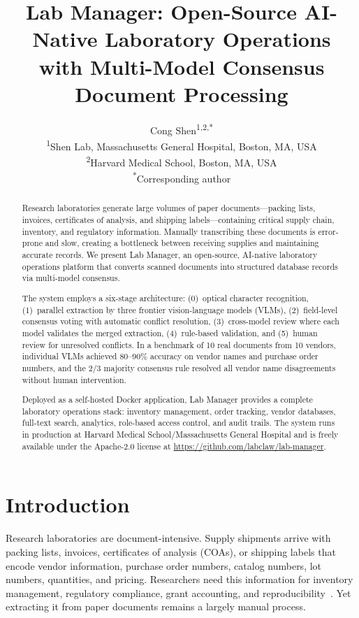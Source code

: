\documentclass[11pt]{article}
\title{Lab Manager: Open-Source AI-Native Laboratory Operations \\
with Multi-Model Consensus Document Processing}
\author{
  Cong Shen\textsuperscript{1,2,*} \\[6pt]
  \textsuperscript{1}Shen Lab, Massachusetts General Hospital, Boston, MA, USA \\
  \textsuperscript{2}Harvard Medical School, Boston, MA, USA \\
  \textsuperscript{*}Corresponding author
}
\date{}
\begin{document}
\maketitle

\begin{abstract}
Research laboratories generate large volumes of paper
documents---packing lists, invoices, certificates of analysis, and shipping
labels---containing critical supply chain, inventory, and regulatory
information. Manually transcribing these documents is error-prone and slow,
creating a bottleneck between receiving supplies and maintaining accurate
records. We present Lab Manager, an open-source, AI-native laboratory
operations platform that converts scanned documents into structured
database records via multi-model consensus.

The system employs a six-stage architecture: (0)~optical character
recognition, (1)~parallel extraction by three frontier vision-language
models (VLMs), (2)~field-level consensus voting with automatic conflict
resolution, (3)~cross-model review where each model validates the merged
extraction, (4)~rule-based validation, and (5)~human review for unresolved
conflicts. In a benchmark of 10 real documents from 10 vendors, individual
VLMs achieved 80--90\% accuracy on vendor names and purchase order numbers,
and the 2/3 majority consensus rule resolved all vendor name disagreements
without human intervention.

Deployed as a self-hosted Docker application, Lab Manager provides a
complete laboratory operations stack: inventory management, order tracking,
vendor databases, full-text search, analytics, role-based access control,
and audit trails. The system runs in production at Harvard Medical
School/Massachusetts General Hospital and is freely available under the
Apache-2.0 license at \url{https://github.com/labclaw/lab-manager}.
\end{abstract}

\section{Introduction}
\label{sec:intro}

Research laboratories are document-intensive. Supply shipments arrive
with packing lists, invoices, certificates of analysis (COAs), or shipping
labels that encode vendor information, purchase order numbers, catalog
numbers, lot numbers, quantities, and pricing. Researchers need this
information for inventory management, regulatory compliance, grant
accounting, and
reproducibility~\citep{wilkinson2016fair, baker2016reproducibility}. Yet
extracting it from paper documents remains a largely manual process.
\end{document}
